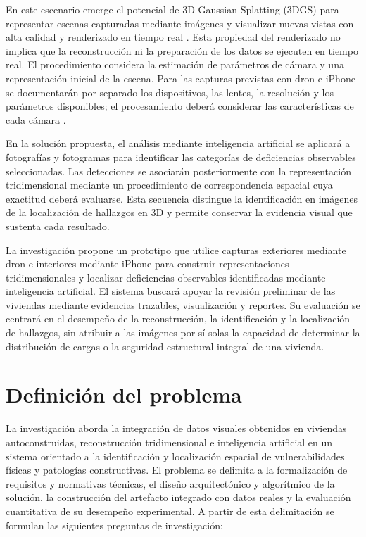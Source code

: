 \documentclass[12pt,oneside]{report}
\begin{document}
En este escenario emerge el potencial de 3D Gaussian Splatting (3DGS) para representar escenas capturadas mediante imágenes y visualizar nuevas vistas con alta calidad y renderizado en tiempo real \citep{kerbl2023}. Esta propiedad del renderizado no implica que la reconstrucción ni la preparación de los datos se ejecuten en tiempo real. El procedimiento considera la estimación de parámetros de cámara y una representación inicial de la escena. Para las capturas previstas con dron e iPhone se documentarán por separado los dispositivos, las lentes, la resolución y los parámetros disponibles; el procesamiento deberá considerar las características de cada cámara \citep{colmaptutorial}.\par

En la solución propuesta, el análisis mediante inteligencia artificial se aplicará a fotografías y fotogramas para identificar las categorías de deficiencias observables seleccionadas. Las detecciones se asociarán posteriormente con la representación tridimensional mediante un procedimiento de correspondencia espacial cuya exactitud deberá evaluarse. Esta secuencia distingue la identificación en imágenes de la localización de hallazgos en 3D y permite conservar la evidencia visual que sustenta cada resultado.\par

La investigación propone un prototipo que utilice capturas exteriores mediante dron e interiores mediante iPhone para construir representaciones tridimensionales y localizar deficiencias observables identificadas mediante inteligencia artificial. El sistema buscará apoyar la revisión preliminar de las viviendas mediante evidencias trazables, visualización y reportes. Su evaluación se centrará en el desempeño de la reconstrucción, la identificación y la localización de hallazgos, sin atribuir a las imágenes por sí solas la capacidad de determinar la distribución de cargas o la seguridad estructural integral de una vivienda.\par


\section{Definición del problema}
La investigación aborda la integración de datos visuales obtenidos en viviendas autoconstruidas, reconstrucción tridimensional e inteligencia artificial en un sistema orientado a la identificación y localización espacial de vulnerabilidades físicas y patologías constructivas. El problema se delimita a la formalización de requisitos y normativas técnicas, el diseño arquitectónico y algorítmico de la solución, la construcción del artefacto integrado con datos reales y la evaluación cuantitativa de su desempeño experimental. A partir de esta delimitación se formulan las siguientes preguntas de investigación:
\end{document}
